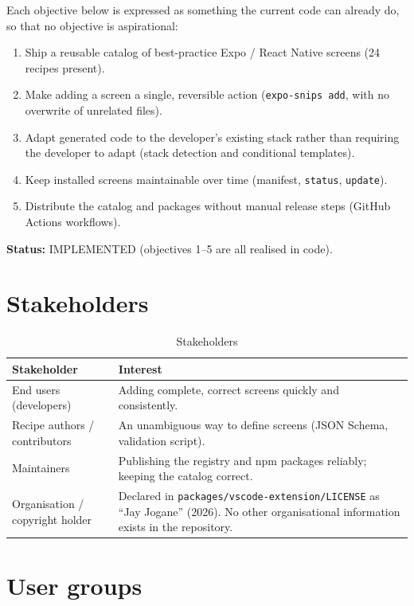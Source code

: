 Each objective below is expressed as something the current code can already do,
so that no objective is aspirational:

\begin{enumerate}
  \item Ship a reusable catalog of best-practice Expo / React Native screens
        (24 recipes present).
  \item Make adding a screen a single, reversible action
        (\texttt{expo-snips add}, with no overwrite of unrelated files).
  \item Adapt generated code to the developer's existing stack rather than
        requiring the developer to adapt (stack detection and conditional
        templates).
  \item Keep installed screens maintainable over time (manifest, \texttt{status},
        \texttt{update}).
  \item Distribute the catalog and packages without manual release steps
        (GitHub Actions workflows).
\end{enumerate}

\textbf{Status:} IMPLEMENTED (objectives 1--5 are all realised in code).

\section{Stakeholders}

\begin{longtable}{p{4.2cm}p{10.2cm}}
\caption{Stakeholders}\\
\toprule
\textbf{Stakeholder} & \textbf{Interest} \\
\midrule

End users (developers) & Adding complete, correct screens quickly and consistently. \\
Recipe authors / contributors & An unambiguous way to define screens (JSON Schema, validation script). \\
Maintainers & Publishing the registry and npm packages reliably; keeping the catalog correct. \\
Organisation / copyright holder & Declared in \texttt{packages/vscode-extension/LICENSE} as ``Jay Jogane'' (2026). No other organisational information exists in the repository. \\
\bottomrule
\end{longtable}

\section{User groups}

